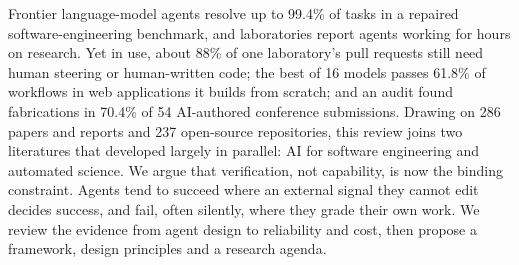 Frontier language-model agents resolve up to 99.4\% of tasks in a repaired software-engineering benchmark, and laboratories report agents working for hours on research. Yet in use, about 88\% of one laboratory's pull requests still need human steering or human-written code; the best of 16 models passes 61.8\% of workflows in web applications it builds from scratch; and an audit found fabrications in 70.4\% of 54 AI-authored conference submissions. Drawing on 286 papers and reports and 237 open-source repositories, this review joins two literatures that developed largely in parallel: AI for software engineering and automated science. We argue that verification, not capability, is now the binding constraint. Agents tend to succeed where an external signal they cannot edit decides success, and fail, often silently, where they grade their own work. We review the evidence from agent design to reliability and cost, then propose a framework, design principles and a research agenda.
